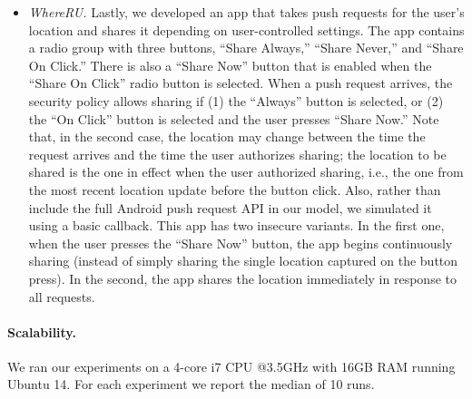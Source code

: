 \documentclass{llncs}
\begin{document}
\begin{itemize}[leftmargin=*]
\item \textit{WhereRU.} Lastly, we developed an app
  that takes push requests for the user's location and shares it depending
  on user-controlled settings.
  The app contains a radio group with three buttons, ``Share Always,'' ``Share
  Never,'' and ``Share On Click.'' There is also a ``Share Now'' button that
  is enabled when the ``Share On Click'' radio button is selected.  When a
  push request arrives, the security policy allows sharing if (1) the ``Always''
  button is selected, or (2) the ``On Click'' button is selected and the user
  presses ``Share Now.'' Note that, in the second case, the location may
  change between the time the request arrives and the time the user authorizes
  sharing; the location to be shared is the one in effect when the user
  authorized sharing, i.e., the one from the most recent location update
  before the button click. Also, rather than include the full
  Android push request API in our model, we simulated it using a basic callback.
  This app has two insecure variants. In the first one, when the user
  presses the ``Share Now'' button, the app begins continuously
  sharing (instead of simply sharing the single location captured on
  the button press).  In the second, the app
  shares the location immediately in response to all requests.

\end{itemize}

\paragraph*{Scalability.}
We ran our experiments on a 4-core i7 CPU @3.5GHz with 16GB
RAM running Ubuntu 14. For each experiment we report the median of 10
runs.
\end{document}
